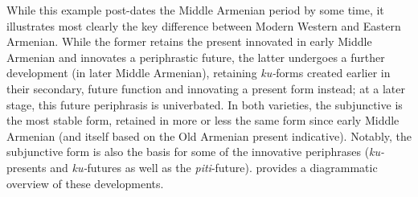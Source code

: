 \documentclass[output=paper,colorlinks,citecolor=brown]{langscibook}
\begin{document}
	While this example post-dates the Middle Armenian period by some time, it illustrates most clearly the key difference between Modern Western and Eastern Armenian. While the former retains the present innovated in early Middle Armenian and innovates a periphrastic future, the latter undergoes a further development (in later Middle Armenian), retaining \textit{ku-}forms created earlier in their secondary, future function and innovating a present form instead; at a later stage, this future periphrasis is univerbated. In both varieties, the subjunctive is the most stable form, retained in more or less the same form since early Middle Armenian (and itself based on the Old Armenian present indicative). Notably, the subjunctive form is also the basis for some of the innovative periphrases (\textit{ku-}presents and \textit{ku-}futures as well as the \textit{piti}-future).  provides a diagrammatic overview of these developments.
\end{document}
